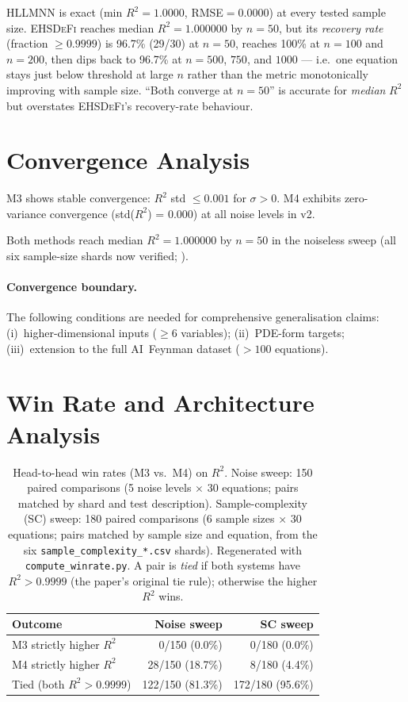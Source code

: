 \documentclass[twoside,11pt]{article}
\newcommand{\EHD}{\textsc{EHSDeFi}}
\newcommand{\HSL}{\textsc{HLLMNN}}
\newcommand{\Rsq}{R^{2}}
\begin{document}
\HSL{} is exact (min $\Rsq=1.0000$, RMSE$=0.0000$) at every tested
sample size. \EHD{} reaches median $\Rsq=1.000000$ by $n=50$, but its
\emph{recovery rate} (fraction $\geq0.9999$) is 96.7\% (29/30) at
$n=50$, reaches 100\% at $n=100$ and $n=200$, then dips back to 96.7\%
at $n=500$, $750$, and $1000$ --- i.e.\ one equation stays just below
threshold at large $n$ rather than the metric monotonically improving
with sample size. ``Both converge at $n=50$'' is accurate for
\emph{median} $\Rsq$ but overstates \EHD's recovery-rate behaviour.

\section{Convergence Analysis}
\label{sec:convergence}

M3 shows stable convergence: $\Rsq$ std $\leq 0.001$ for $\sigma>0$.
M4 exhibits zero-variance convergence (std($\Rsq$) = 0.000) at all noise
levels in v2.

Both methods reach median $\Rsq=1.000000$ by $n=50$ in the noiseless sweep (all six sample-size
shards now verified; ).

\paragraph{Convergence boundary.}
The following conditions are needed for comprehensive generalisation claims:
(i)~higher-dimensional inputs ($\geq 6$ variables);
(ii)~PDE-form targets;
(iii)~extension to the full AI~Feynman dataset ($>100$ equations).

\section{Win Rate and Architecture Analysis}
\label{sec:winrate}

\begin{table}[H]
\centering
\caption{Head-to-head win rates (M3 vs.\ M4) on $\Rsq$. Noise sweep: 150 paired
comparisons (5 noise levels $\times$ 30 equations; pairs matched by shard and
test description). Sample-complexity (SC) sweep: 180 paired comparisons (6 sample
sizes $\times$ 30 equations; pairs matched by sample size and equation, from the
six \texttt{sample\_complexity\_*.csv} shards). Regenerated with
\texttt{compute\_winrate.py}. A pair is \emph{tied} if both systems have
$\Rsq>0.9999$ (the paper's original tie rule); otherwise the higher $\Rsq$ wins.
}
\label{tab:winrate}
\small
\begin{tabular}{l r r}
\toprule
\textbf{Outcome} & \textbf{Noise sweep} & \textbf{SC sweep}\\
\midrule
M3 strictly higher $\Rsq$ & 0/150 (0.0\%) & 0/180 (0.0\%)\\
M4 strictly higher $\Rsq$ & 28/150 (18.7\%) & 8/180 (4.4\%)\\
Tied (both $\Rsq>0.9999$)  & 122/150 (81.3\%) & 172/180 (95.6\%)\\
\bottomrule
\end{tabular}
\end{table}
\end{document}

